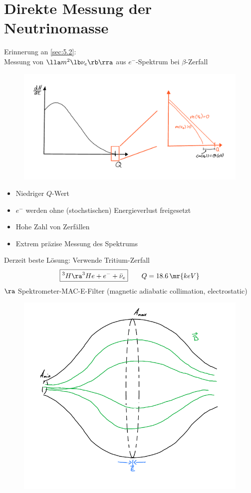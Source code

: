 \section{Direkte Messung der Neutrinomasse}
Erinnerung an \ref{sec:5.2}:\\
Messung von $\lla m^2 \lb \nu_e\rb \rra$ aus $e^-$-Spektrum bei $\beta$-Zerfall
\begin{figure}[!ht]
\centering
\includegraphics[width=.6\textwidth]{imgs/ep5-fig-9-1.pdf}
\end{figure}
\begin{itemize}
\item Niedriger $Q$-Wert
\item $e^-$ werden ohne (stochstischen) Energieverlust freigesetzt
\item Hohe Zahl von Zerfällen
\item Extrem präzise Messung des Spektrums
\end{itemize}
Derzeit beste Lösung: Verwende Tritium-Zerfall
\begin{align}
\boxed{ ^3 H \ra ^3He + e^- + \bar{\nu}_e} \qquad Q = 18.6\,\mr{keV}
\end{align}
$\ra$ Spektrometer-MAC-E-Filter (magnetic adiabatic collimation, electrostatic)
\begin{figure}[!ht]
\centering
\includegraphics[width=.5\textwidth]{imgs/ep5-fig-9-2.pdf}
\end{figure}
